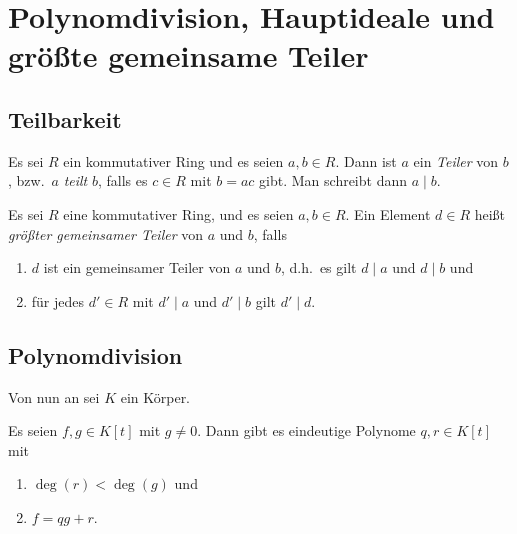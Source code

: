 \section{Polynomdivision, Hauptideale und größte gemeinsame Teiler}





\subsection{Teilbarkeit}

\begin{definition}
  Es sei $R$ ein kommutativer Ring und es seien $a, b \in R$.
  Dann ist $a$ ein \emph{Teiler} von $b$, bzw.\ $a$ \emph{teilt} $b$, falls es $c \in R$ mit $b = ac$ gibt.
  Man schreibt dann $a \mid b$.
\end{definition}

\begin{definition}
  Es sei $R$ eine kommutativer Ring, und es seien $a, b \in R$.
  Ein Element $d \in R$ heißt \emph{größter gemeinsamer Teiler} von $a$ und $b$, falls
  \begin{enumerate}
    \item
      $d$ ist ein gemeinsamer Teiler von $a$ und $b$, d.h.\ es gilt $d \mid a$ und $d \mid b$ und
    \item
      für jedes $d' \in R$ mit $d' \mid a$ und $d' \mid b$ gilt $d' \mid d$.
  \end{enumerate}
\end{definition}





\subsection{Polynomdivision}

Von nun an sei $K$ ein Körper.

\begin{theorem}
  \label{theorem: polynomial division}
  Es seien $f, g \in K[t]$ mit $g \neq 0$.
  Dann gibt es eindeutige Polynome $q, r \in K[t]$ mit
  \begin{enumerate}
    \item
      $\deg(r) < \deg(g)$ und
    \item
      $f = qg + r$.
  \end{enumerate}
\end{theorem}


